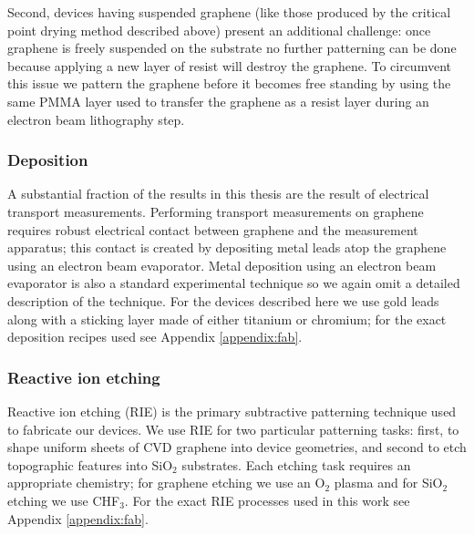\documentclass[edeposit,fullpage,draftthesis]{uiucthesis2009}
\begin{document}
            Second, devices having suspended graphene (like those produced by the critical point
            drying method described above) present an additional challenge: once graphene is freely
            suspended on the substrate no further patterning can be done because applying a new layer
            of resist will destroy the graphene. To circumvent this issue we pattern the graphene
            before it becomes free standing by using the same PMMA layer
            used to transfer the graphene as a resist layer during an electron beam lithography step.
            
            \subsubsection{Deposition}
            
            A substantial fraction of the results in this thesis are the result of electrical transport measurements.
            Performing transport measurements on graphene requires robust electrical contact between
            graphene and the measurement apparatus; this contact is created by depositing
            metal leads atop the graphene using an electron beam evaporator. 
            Metal deposition using an electron beam evaporator is also a standard experimental technique
            so we again omit a detailed description of the technique.
            For the devices described here we use gold leads along with a sticking layer made of either
            titanium or chromium; for the exact deposition recipes used see Appendix \ref{appendix:fab}.
            
            \subsubsection{Reactive ion etching}
            
            Reactive ion etching (RIE) is the primary subtractive patterning technique used 
            to fabricate our devices. We use RIE for two particular patterning tasks: first, to 
            shape uniform sheets of CVD graphene into device geometries, and second to etch
            topographic features into SiO$_2$ substrates. 
            Each etching task requires an appropriate chemistry; for graphene etching we use
            an O$_2$ plasma and for SiO$_2$ etching we use CHF$_3$.
            For the exact RIE processes used in this work see Appendix \ref{appendix:fab}.
    
\end{document}
